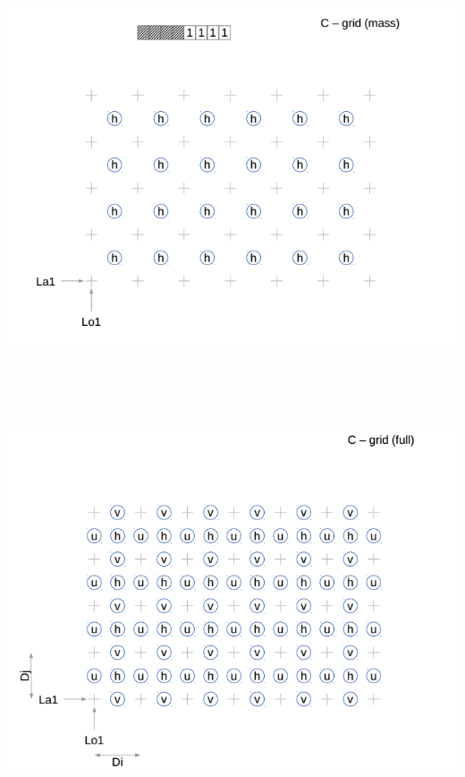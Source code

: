 {}\includegraphics[width=6.49931in,height=4.87153in]{../tex/extracted-media/media/image5.png}\includegraphics[width=6.49931in,height=4.89306in]{../tex/extracted-media/media/image6.png}\textbf{\\
}
